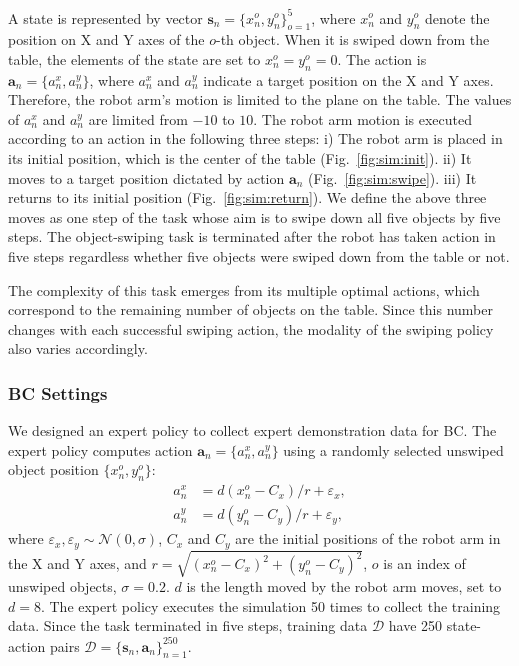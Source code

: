 \documentclass[sn-mathphys-num]{sn-jnl}
\begin{document}
A state is represented by vector ${\mathbf{s}}_n=\{x^{o}_n, y^{o}_n\}_{o=1}^{5}$, where $x^{o}_n$ and $y^{o}_n$ denote the position on X and Y axes of the $o$-th object.
When it is swiped down from the table, the elements of the state are set to $x^{o}_n = y^{o}_n = 0$.
The action is ${\mathbf{a}}_{n}=\{a_{n}^{x}, a_{n}^{y}\}$, where $a_{n}^{x}$ and $a_{n}^{y}$ indicate a target position on the X and Y axes.
Therefore, the robot arm's motion is limited to the plane on the table.
The values of $a^x_n$ and $a^y_n$ are limited from $-10$ to $10$.
The robot arm motion is executed according to an action in the following three steps:
i) The robot arm is placed in its initial position, which is the center of the table (Fig.~\ref{fig:sim:init}).
ii) It moves to a target position dictated by action ${\mathbf a}_{n}$ (Fig.~\ref{fig:sim:swipe}).
iii) It returns to its initial position (Fig.~\ref{fig:sim:return}).
We define the above three moves as one step of the task whose aim is to swipe down all five objects by five steps.
The object-swiping task is terminated after the robot has taken action in five steps regardless whether five objects were swiped down from the table or not.

The complexity of this task emerges from its multiple optimal actions, which correspond to the remaining number of objects on the table.
Since this number changes with each successful swiping action, the modality of the swiping policy also varies accordingly.

\subsubsection{BC Settings}
We designed an expert policy to collect expert demonstration data for BC.
The expert policy computes action ${\mathbf{a}}_n=\{a_n^x, a_n^y\}$ using a randomly selected unswiped object position $\{x_n^o, y_n^o\}$:
\begin{align}
    a_n^x &= d(x_n^o-C_x)/r+\varepsilon_x, \nonumber \\
    a_n^y &= d(y_n^o-C_y)/r+\varepsilon_y, \nonumber
\end{align}
where $\varepsilon_x, \varepsilon_y \sim {\mathcal N}(0, \sigma)$, $C_x$ and $C_y$ are the initial positions of the robot arm in the X and Y axes, and $r = \sqrt{(x^{o}_n-C_{x})^{2}+(y^{o}_n-C_{y})^2}$, $o$ is an index of unswiped objects,  $\sigma=0.2$.
$d$ is the length moved by the robot arm moves, set to $d=8$.
The expert policy executes the simulation 50 times to collect the training data.
Since the task terminated in five steps, training data ${\mathcal D}$ have 250 state-action pairs ${\mathcal D}=\{{\mathbf{s}}_n, {\mathbf{a}}_n\}_{n=1}^{250}$.
\end{document}
